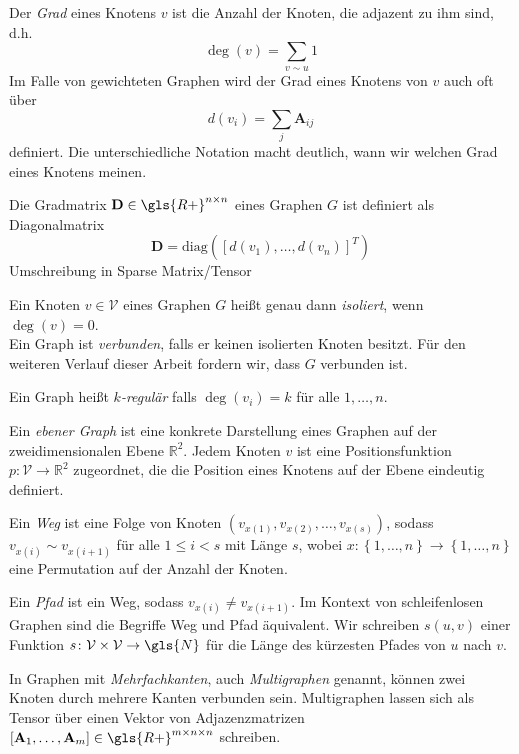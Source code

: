 Der \emph{Grad} eines Knotens $v$ ist die Anzahl der Knoten, die adjazent zu ihm sind, d.h.
\begin{equation}
  \deg\left(v\right) = \sum_{v \sim u} 1
\end{equation}
Im Falle von gewichteten Graphen wird der Grad eines Knotens von $v$ auch oft über
\begin{equation}
  d\left(v_i\right) = \sum_{j} \mathbf{A}_{ij}
\end{equation}
definiert.
Die unterschiedliche Notation macht deutlich, wann wir welchen Grad eines Knotens meinen.

Die Gradmatrix $\mathbf{D} \in \gls{R+}^{n \times n}$ eines Graphen $G$ ist definiert als Diagonalmatrix
\begin{equation}
  \mathbf{D} = \text{diag}\left( {\left[ d\left(v_1\right), \ldots, d\left(v_n\right) \right]}^T \right)
\end{equation}
Umschreibung in Sparse Matrix/Tensor

Ein Knoten $v \in \mathcal{V}$ eines Graphen $G$ heißt genau dann \emph{isoliert}, wenn $\deg\left(v\right) = 0$.\\
Ein Graph ist \emph{verbunden}, falls er keinen isolierten Knoten besitzt.
Für den weiteren Verlauf dieser Arbeit fordern wir, dass $G$ verbunden ist.\

Ein Graph heißt \emph{$k$-regulär} falls $\deg\left(v_i\right) = k$ für alle $1, \ldots, n$.

Ein \emph{ebener Graph} ist eine konkrete Darstellung eines Graphen auf der zweidimensionalen Ebene $\mathbb{R}^2$.
Jedem Knoten $v$ ist eine Positionsfunktion $p \colon \mathcal{V} \to \mathbb{R}^2$ zugeordnet, die die Position eines Knotens auf der Ebene eindeutig definiert.

Ein \emph{Weg} ist eine Folge von Knoten $\left( v_{x\left(1\right)}, v_{x\left(2\right)}, \ldots, v_{x\left(s\right)} \right)$, sodass $v_{x\left(i\right)} \sim v_{x\left(i+1\right)}$ für alle $1 \leq i < s$ mit Länge $s$, wobei $x \colon \left\{ 1, \ldots, n \right\} \to \left\{ 1, \ldots, n \right\}$ eine Permutation auf der Anzahl der Knoten.

Ein \emph{Pfad} ist ein Weg, sodass $v_{x\left(i\right)} \neq v_{x\left(i+1\right)}$.
Im Kontext von schleifenlosen Graphen sind die Begriffe Weg und Pfad äquivalent.
Wir schreiben $s\left(u, v\right)$ einer Funktion $s \colon \mathcal{V} \times \mathcal{V} \to \gls{N}$ für die Länge des kürzesten Pfades von $u$ nach $v$.

In Graphen mit \emph{Mehrfachkanten}, auch \emph{Multigraphen} genannt, können zwei Knoten durch mehrere Kanten verbunden sein.
Multigraphen lassen sich als Tensor über einen Vektor von Adjazenzmatrizen $\left[\mathbf{A}_1, \ldots, \mathbf{A}_m\right] \in \gls{R+}^{m \times n \times n}$ schreiben.
